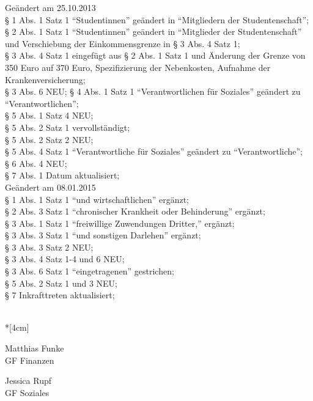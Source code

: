 Geändert am 25.10.2013 \\
§ 1 Abs. 1 Satz 1 "`Studentinnen"' geändert in "`Mitgliedern der Studentenschaft"'; \\
§ 2 Abs. 1 Satz 1 "`Studentinnen"' geändert in "`Mitglieder der Studentenschaft"' und Verschiebung der Einkommensgrenze in § 3 Abs. 4 Satz 1; \\
§ 3 Abs. 4 Satz 1 eingefügt aus § 2 Abs. 1 Satz 1 und Änderung der Grenze von 350 Euro auf 370 Euro, Spezifizierung der Nebenkosten, Aufnahme der Krankenversicherung; \\
§ 3 Abs. 6 NEU;
§ 4 Abs. 1 Satz 1 "`Verantwortlichen für Soziales"' geändert zu "`Verantwortlichen"';\\
§ 5 Abs. 1 Satz 4 NEU;\\
§ 5 Abs. 2 Satz 1 vervollständigt;\\
§ 5 Abs. 2 Satz 2 NEU;\\
§ 5 Abs. 4 Satz 1 "`Verantwortliche für Soziales"' geändert zu "`Verantwortliche"';\\
§ 6 Abs. 4 NEU;\\
§ 7 Abs. 1 Datum aktualisiert;\\

Geändert am 08.01.2015 \\
§ 1 Abs. 1 Satz 1 "`und wirtschaftlichen"' ergänzt;\\
§ 2 Abs. 3 Satz 1 "`chronischer Krankheit oder Behinderung"' ergänzt;\\
§ 3 Abs. 1 Satz 1 "`freiwillige Zuwendungen Dritter,"' ergänzt;\\
§ 3 Abs. 3 Satz 1 "`und sonstigen Darlehen"' ergänzt;\\
§ 3 Abs. 3 Satz 2 NEU;\\
§ 3 Abs. 4 Satz 1-4 und 6 NEU;\\
§ 3 Abs. 6 Satz 1 "`eingetragenen"' gestrichen;\\
§ 5 Abs. 2 Satz 1 und 3 NEU;\\
§ 7 Inkrafttreten aktualisiert;


\normalsize
~\\*[4cm]
\begin{center}
\hspace*{\fill}
\parbox{7cm}{Matthias Funke\\GF Finanzen}
\hfill\parbox{7cm}{Jessica Rupf\\GF Soziales}
\hspace*{\fill}
\end{center}